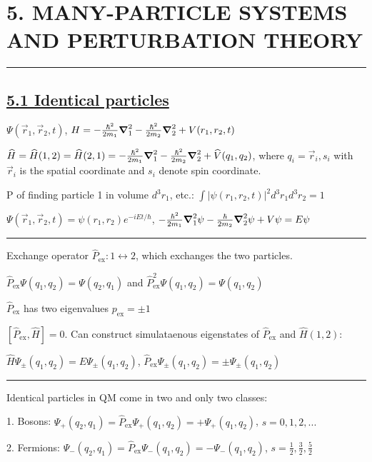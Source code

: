 \section{5. MANY-PARTICLE SYSTEMS AND PERTURBATION THEORY} \hrule height 0.3pt \thinspace

\subsection{\underline{5.1 Identical particles}}

$\Psi(\vec{r}_1, \vec{r}_2, t)$, $H = -\frac{\hbar^2}{2m_1} \grad_1^2 - \frac{\hbar^2}{2m_2} \grad_2^2 + V(r_1, r_2, t)$

$\widehat{H} = \widehat{H}(1, 2) = \widehat{H}(2, 1) = -\frac{\hbar^2}{2m_1} \grad_1^2 - \frac{\hbar^2}{2m_2} \grad_2^2 + \widehat{V}(q_1, q_2)$, where $q_i = \vec{r}_i, s_i$ with $\vec{r}_i$ is the spatial coordinate and $s_i$ denote spin coordinate.

P of finding particle 1 in volume $d^3 r_1$, etc.: $\int | \psi(r_1, r_2, t)|^2 d^3 r_1 d^3 r_2 = 1$

$\Psi(\vec{r}_1, \vec{r}_2, t) = \psi(r_1, r_2) e^{-iEt/\hbar}$, $-\frac{\hbar^2}{2m_1} \grad_1^2 \psi - \frac{\hbar}{2m_2} \grad_2^2 \psi + V \psi = E \psi$

\hrule height 0.07pt

Exchange operator $\widehat{P}_{\textrm{ex}}: 1 \leftrightarrow 2$, which exchanges the two particles.

$\widehat{P}_{\textrm{ex}} \Psi(q_1, q_2) = \Psi(q_2, q_1)$ and $\widehat{P}^2_{\textrm{ex}} \Psi(q_1, q_2) = \Psi(q_1, q_2)$

$\widehat{P}_{\textrm{ex}}$ has two eigenvalues $p_{\textrm{ex}} = \pm 1$

$[\widehat{P}_{\textrm{ex}}, \widehat{H}] = 0$. Can construct simulataenous eigenstates of $\widehat{P}_{\textrm{ex}}$ and $\widehat{H}(1, 2)$:

$\widehat{H} \Psi_{\pm}(q_1, q_2) = E \Psi_{\pm}(q_1, q_2)$, $\widehat{P}_\textrm{ex} \Psi_{\pm} (q_1, q_2) = \pm \Psi_{\pm}(q_1, q_2)$

\hrule height 0.07pt

Identical particles in QM come in two and only two classes:

1. Bosons: $\Psi_{+}(q_2, q_1) = \widehat{P}_{\textrm{ex}} \Psi_{+}(q_1, q_2) = + \Psi_{+}(q_1, q_2)$, $s=0,1,2,...$

2. Fermions: $\Psi_{-}(q_2, q_1) = \widehat{P}_{\textrm{ex}} \Psi_{-}(q_1, q_2) = - \Psi_{-}(q_1, q_2)$, $s=\frac{1}{2}, \frac{3}{2}, \frac{5}{2}$

